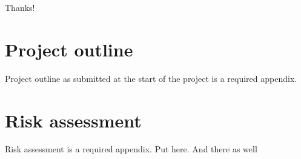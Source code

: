 
\makeatletter
\title{\xmp@Title}
\studentid{\xmp@Author}
\makeatother

\maketitle



\uomtoc


\begin{abstract} %
  This is abstract text.

  \lipsum[1-2]
\end{abstract}%
\clearpage


\uomdeclarations %


\begin{uomacknowledgements}
  Thanks!
\end{uomacknowledgements}






\printbibliography[title={References},heading=bibintoc]


\newpage
\printglossary[type=\acronymtype]

\begin{uomappendix}
    \section{Project outline}
    Project outline as submitted at the start of the project is a required appendix.

    \section{Risk assessment}
    Risk assessment is a required appendix. Put here. And there as well
\end{uomappendix}



